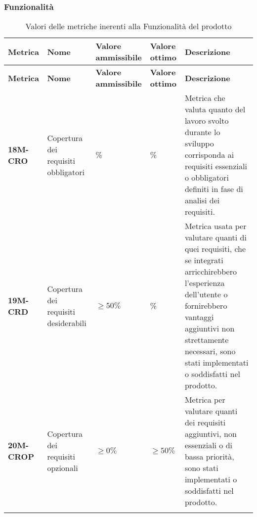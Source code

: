 \subsubsection{Funzionalità}
\begin{longtable}{|>{\centering\arraybackslash}p{}|>{\centering\arraybackslash}p{}|>{\centering\arraybackslash}p{}|>{\centering\arraybackslash}p{}|>{\centering\arraybackslash}p{}|}
    \hline
    \textbf{Metrica} & \textbf{Nome} & \textbf{Valore ammissibile} & \textbf{Valore ottimo}& \textbf{Descrizione}\\
	\hline
    \endfirsthead
    \hline
    \textbf{Metrica} & \textbf{Nome} & \textbf{Valore ammissibile} & \textbf{Valore ottimo}& \textbf{Descrizione}\\
    \endhead
	\textbf{18M-CRO} & Copertura dei requisiti obbligatori & 100\%  & 100\% & Metrica che valuta quanto del lavoro svolto durante lo sviluppo corrisponda ai requisiti essenziali o obbligatori definiti in fase di analisi dei requisiti.\\
	\hline
	\textbf{19M-CRD} & Copertura dei requisiti desiderabili & $\geq 50\% $  & 100\% & Metrica usata per valutare quanti di quei requisiti, che se integrati arricchirebbero l'esperienza dell'utente o fornirebbero vantaggi aggiuntivi non strettamente necessari, sono stati implementati o soddisfatti nel prodotto.\\ 
	\hline
	\textbf{20M-CROP} & Copertura dei requisiti opzionali & $\geq 0\% $ & $\geq 50\% $ & Metrica per valutare quanti dei requisiti aggiuntivi, non essenziali o di bassa priorità, sono stati implementati o soddisfatti nel prodotto.\\ 
	\hline
	\caption{ Valori delle metriche inerenti alla Funzionalità del prodotto}
	\label{table:7}
\end{longtable}
